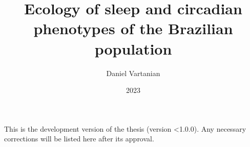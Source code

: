 \documentclass[
  12pt,
  a4paper,
  oneside]{tesesusp}
\title{Ecology of sleep and circadian phenotypes of the Brazilian
population}
\author{Daniel Vartanian}
\date{2023}
\begin{document}
\maketitle


\frenchspacing



\clearpage



\imprimircapa


\imprimirfolhaderosto*


%  


\begin{errata}
This is the development version of the thesis (version \textless1.0.0).
Any necessary corrections will be listed here after its approval.
\end{errata}
\end{document}
